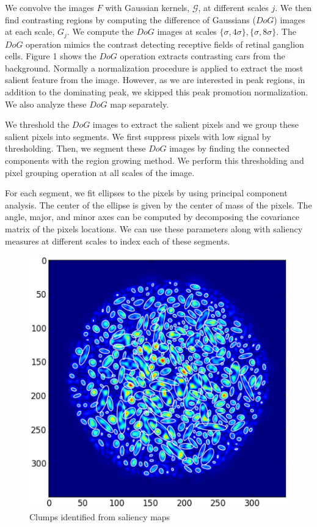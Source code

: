We convolve the images $F$ with Gaussian kernels, $\mathcal{G}$, at different scales $j$.  We then find contrasting regions by computing the difference of Gaussians ($DoG$) images at each scale, $G_{j}$.  We compute the $DoG$ images at scales $\{\sigma,4\sigma\}, \{\sigma,8\sigma\}$.  The $DoG$ operation mimics the contrast detecting receptive fields of retinal ganglion cells.  Figure 1 shows the $DoG$ operation extracts contrasting cars from the background.  Normally a normalization procedure is applied to extract the most salient feature from the image.  However, as we are interested in peak regions, in addition to the dominating peak, we skipped this peak promotion normalization.  We also analyze these $DoG$ map separately.

We threshold the $DoG$ images to extract the salient pixels and we group these salient pixels into segments.  We first suppress pixels with low signal by thresholding.  Then, we segment these $DoG$ images by finding the connected components with the region growing method. We perform this thresholding and pixel grouping operation at all scales of the image.

For each segment, we fit ellipses to the pixels by using principal component analysis.  The center of the ellipse is given by the center of mass of the pixels.  The angle, major, and minor axes can be computed by decomposing the covariance matrix of the pixels locations. We can use these parameters along with saliency measures at different scales to index each of these segments.

\begin{figure}[ht!]
\centering
\includegraphics[scale=0.5]{part9/Teuben_P059/s3-ell-0.eps}
\caption{Clumps identified from saliency maps}
\label{fig:teuben1}
\end{figure}


